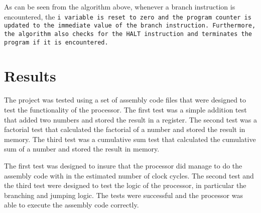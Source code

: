 \documentclass[a4paper,12pt]{article}
\begin{document}
		\par{
			As can be seen from the algorithm above, whenever a branch instruction
			is encountered, the \tt i variable is reset to zero and the program
			counter is updated to the immediate value of the branch instruction.
			Furthermore, the algorithm also checks for the \tt{HALT} instruction
			and terminates the program if it is encountered.
		}


\section{Results}
	\par{
		The project was tested using a set of assembly code files that were
		designed to test the functionality of the processor. The first test
		was a simple addition test that added two numbers and stored the result
		in a register. The second test was a factorial test that calculated the
		factorial of a number and stored the result in memory. The third test
		was a cumulative sum test that calculated the cumulative sum of a number
		and stored the result in memory.
	}
	\par{
		The first test was designed to insure that the processor did manage to
		do the assembly code with in the estimated number of clock cycles. The
		second test and the third test were designed to test the logic of the
		processor, in particular the branching and jumping logic. The tests were
		successful and the processor was able to execute the assembly code
		correctly.
	}
\end{document}
